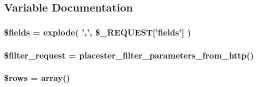 \subsection{Variable Documentation}
\hypertarget{properties__datatable_8php_ab2303c817e3b402b77b7f99627b9c319}{
\subsubsection[{\$fields}]{\setlength{\rightskip}{0pt plus 5cm}\$fields = explode( ',', \$\_\-REQUEST\mbox{[}'fields'\mbox{]} )}}
\label{d7/da4/properties__datatable_8php_ab2303c817e3b402b77b7f99627b9c319}
\hypertarget{properties__datatable_8php_a867e2cebab27257f0c333daace141858}{
\subsubsection[{\$filter\_\-request}]{\setlength{\rightskip}{0pt plus 5cm}\$filter\_\-request = placester\_\-filter\_\-parameters\_\-from\_\-http()}}
\label{d7/da4/properties__datatable_8php_a867e2cebab27257f0c333daace141858}
\hypertarget{properties__datatable_8php_ace2ec39e7df3899fa8df9640ec274b03}{
\subsubsection[{\$rows}]{\setlength{\rightskip}{0pt plus 5cm}\$rows = array()}}
\label{d7/da4/properties__datatable_8php_ace2ec39e7df3899fa8df9640ec274b03}
